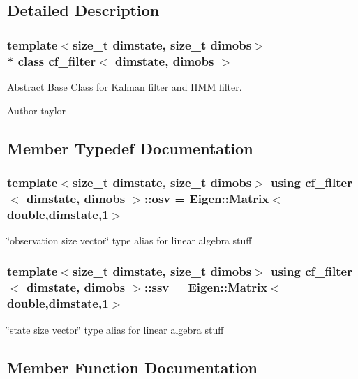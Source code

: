 \subsection{Detailed Description}
\subsubsection*{template$<$size\+\_\+t dimstate, size\+\_\+t dimobs$>$\\*
class cf\+\_\+filter$<$ dimstate, dimobs $>$}

Abstract Base Class for Kalman filter and H\+MM filter. 

\begin{DoxyAuthor}{Author}
taylor 
\end{DoxyAuthor}


\subsection{Member Typedef Documentation}
\subsubsection[{\texorpdfstring{osv}{osv}}]{\setlength{\rightskip}{0pt plus 5cm}template$<$size\+\_\+t dimstate, size\+\_\+t dimobs$>$ using {\bf cf\+\_\+filter}$<$ dimstate, dimobs $>$\+::{\bf osv} =  Eigen\+::\+Matrix$<$double,dimstate,1$>$}\hypertarget{classcf__filter_acd43942497b773a71465cc5e1ff8fa29}{}\label{classcf__filter_acd43942497b773a71465cc5e1ff8fa29}
\char`\"{}observation size vector\char`\"{} type alias for linear algebra stuff 
\subsubsection[{\texorpdfstring{ssv}{ssv}}]{\setlength{\rightskip}{0pt plus 5cm}template$<$size\+\_\+t dimstate, size\+\_\+t dimobs$>$ using {\bf cf\+\_\+filter}$<$ dimstate, dimobs $>$\+::{\bf ssv} =  Eigen\+::\+Matrix$<$double,dimstate,1$>$}\hypertarget{classcf__filter_a5562e379d385df4d81c949e32d84ee19}{}\label{classcf__filter_a5562e379d385df4d81c949e32d84ee19}
\char`\"{}state size vector\char`\"{} type alias for linear algebra stuff 

\subsection{Member Function Documentation}
